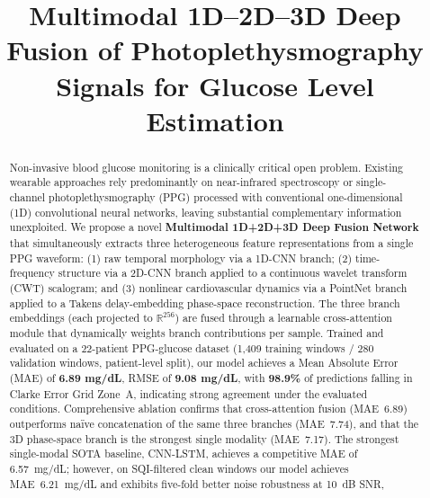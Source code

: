 \documentclass[conference]{IEEEtran}
\begin{document}
\title{Multimodal 1D--2D--3D Deep Fusion of Photoplethysmography Signals
       for Glucose Level Estimation}

\author{
}

\maketitle

\begin{abstract}
Non-invasive blood glucose monitoring is a clinically critical open problem.
Existing wearable approaches rely predominantly on near-infrared spectroscopy or
single-channel photoplethysmography (PPG) processed with conventional
one-dimensional (1D) convolutional neural networks, leaving substantial
complementary information unexploited.  We propose a novel
\textbf{Multimodal 1D+2D+3D Deep Fusion Network} that simultaneously extracts
three heterogeneous feature representations from a single PPG waveform:
(1) raw temporal morphology via a 1D-CNN branch;
(2) time-frequency structure via a 2D-CNN branch applied to a
    continuous wavelet transform (CWT) scalogram; and
(3) nonlinear cardiovascular dynamics via a PointNet branch applied to a
    Takens delay-embedding phase-space reconstruction.
The three branch embeddings (each projected to $\mathbb{R}^{256}$) are fused
through a learnable cross-attention module that dynamically weights branch
contributions per sample.
Trained and evaluated on a 22-patient PPG-glucose dataset
(1,409 training windows / 280 validation windows, patient-level split),
our model achieves a Mean Absolute Error (MAE) of \textbf{6.89 mg/dL},
RMSE of \textbf{9.08 mg/dL}, with \textbf{98.9\%} of predictions falling in
Clarke Error Grid Zone~A, indicating strong agreement under the evaluated
conditions.
Comprehensive ablation confirms that cross-attention fusion (MAE~6.89)
outperforms na\"ive concatenation of the same three branches (MAE~7.74),
and that the 3D phase-space branch is the strongest single modality (MAE~7.17).
The strongest single-modal SOTA baseline, CNN-LSTM, achieves a competitive
MAE of 6.57~mg/dL; however, on SQI-filtered clean windows our model achieves
MAE~6.21~mg/dL and exhibits five-fold better noise robustness at 10~dB SNR,

\end{abstract}
\end{document}
